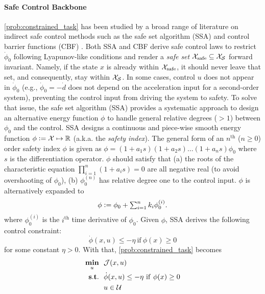 \paragraph{Safe Control Backbone}

\eqref{prob:constrained_task} has been studied by a broad range of literature on indirect safe control methods such as the safe set algorithm (SSA) \cite{liu2014control} and control barrier functions (CBF) \cite{ames2014control}.
Both SSA and CBF derive safe control laws to restrict $\dot{\phi}_0$ following Lyapunov-like conditions and render a \textit{safe set} $\mathcal{X}_\mathrm{safe}\subseteq\mathcal{X}_{\mathcal{S}}$ forward invariant.
Namely, if the state $x$ is already within $\mathcal{X}_\mathrm{safe}$, it should never leave that set, and consequently, stay within $\mathcal{X}_{\mathcal{S}}$.
In some cases, control $u$ does not appear in $\dot\phi_0$ (e.g., $\dot\phi_0 =  - \dot d$ does not depend on the acceleration input for a second-order system), preventing the control input from driving the system to safety.
To solve that issue, the safe set algorithm (SSA) \cite{liu2014control} provides a systematic approach to design an alternative energy function $\phi$ to handle general relative degrees ($>1$) between $\phi_0$ and the control.
SSA designs a continuous and piece-wise smooth energy function $\phi \vcentcolon= \mathcal{X} \mapsto \mathbb{R}$ (a.k.a. the {\textit{safety index}}).
The general form of an $n^\mathrm{th}$ ($n\geq 0$) order safety index $\phi$ is given as
$\phi = (1+a_1 s)(1+a_2 s)\dots(1+a_n s)\phi_0$ where $s$ is the differentiation operator.
$\phi$ should satisfy that (a) the roots of the characteristic equation $\prod_{i=1}^n(1+a_i s) = 0$ are all negative real (to avoid overshooting of $\phi_0$), (b) $\phi_0^{(n)}$ has relative degree one to the control input.
$\phi$ is alternatively expanded to
\begin{equation}\label{def:phi_root}
    \phi \vcentcolon= \phi_0 + \textstyle\sum_{i=1}^{n}k_i \phi^{(i)}_0.
\end{equation}
where $\phi_0^{(i)}$ is the $i^\mathrm{th}$ time derivative of $\phi_0$.
Given $\phi$, SSA derives the following control constraint:
\begin{equation}\label{eq:safe_control_law}
    \dot{\phi}(x,u) \leq -\eta~\mathrm{if}~\phi(x) \geq 0 
\end{equation}
for some constant $\eta>0$.
With that, \eqref{prob:constrained_task} becomes
\begin{subequations}\label{prob:single_safe_control}
\begin{align}
\mathop{\underset{{u}}{\mathop{\mathbf{min}}}}~~ & \mathcal{J}(x,u)   \\
\mathop{\mathbf{s.t.}}~~ & \dot{\phi}(x,u) \leq -\eta~\mathrm{if}~\phi(x) \geq 0 \label{eq:single_safe_control_phi_constr} \\
& u\in\mathcal{U} \label{eq:single_safe_control_control_limit}
\end{align}
\end{subequations}
